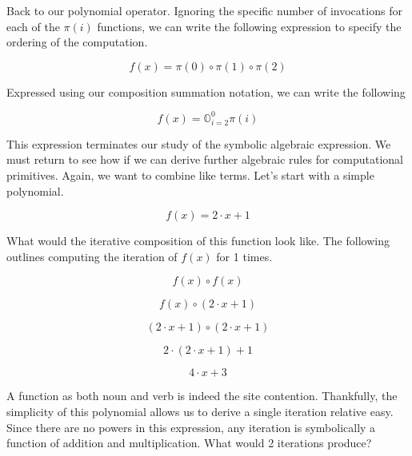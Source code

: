 Back to our polynomial operator. Ignoring the specific number of invocations
for each of the $\pi(i)$ functions, we can write the following expression to
specify the ordering of the computation.

\begin{equation}
    f(x) = \pi(0) \circ \pi(1) \circ \pi(2)
\end{equation}

Expressed using our composition summation notation, we can write the following

\begin{equation}
    f(x) = \mathbb{O}_{i=2}^{0} \pi(i)
\end{equation}

This expression terminates our study of the symbolic algebraic expression. We
must return to see how if we can derive further algebraic rules for
computational primitives. Again, we want to combine like terms. Let's start
with a simple polynomial.

\begin{equation}
    f(x) = 2 \cdot x + 1
\end{equation}

What would the iterative composition of this function look like. The following
outlines computing the iteration of $f(x)$ for 1 times.

\begin{equation}
    f(x) \circ f(x)
\end{equation}

\begin{equation}
    f(x) \circ (2 \cdot x + 1)
\end{equation}

\begin{equation}
    (2 \cdot x + 1) \circ (2 \cdot x + 1)
\end{equation}

\begin{equation}
    2 \cdot (2 \cdot x + 1) + 1
\end{equation}

\begin{equation}
    4 \cdot x + 3
\end{equation}

A function as both noun and verb is indeed the site contention. Thankfully, the
simplicity of this polynomial allows us to derive a single iteration relative
easy. Since there are no powers in this expression, any iteration is
symbolically a function of addition and multiplication. What would 2 iterations
produce?

